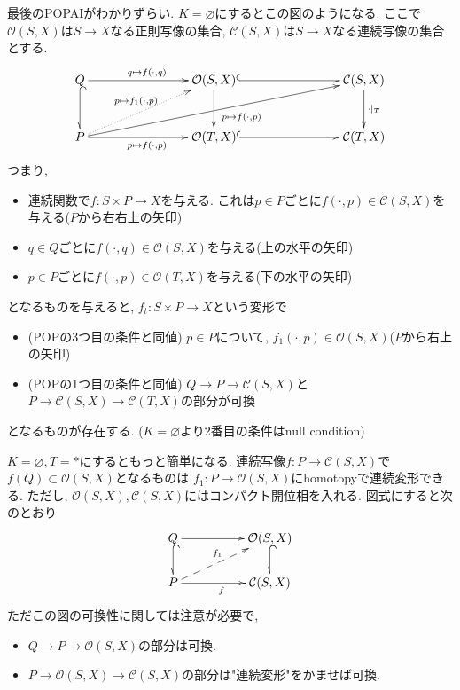 \documentclass[dvipdfmx,a4paper,11pt]{article} %
\theoremstyle{definition}
\theoremstyle{remark}
\numberwithin{equation}{section}
\begin{document}
最後のPOPAIがわかりずらい. $K=\varnothing$にするとこの図のようになる.
ここで$\mathcal{O}(S,X) $は$S \to X$なる正則写像の集合, $\mathcal{C}(S,X) $は$S \to X$なる連続写像の集合とする.
\[
\xymatrix@C=80pt@R=30pt{
Q \ar[r]^{q \mapsto f(\cdot,q)} \ar@{^{(}-_>}[d]& \mathcal{O}(S,X) \ar@{^{(}-_>}[r] \ar[d]& \mathcal{C}(S,X) \ar[d]^{\cdot |_{T}} \\
P \ar[r]_{p \mapsto f(\cdot,p)} \ar@{.>}[ur]^{p \mapsto f_1(\cdot, p)}  \ar@{->}[urr]_{ \quad \quad p \mapsto f(\cdot, p)} & \mathcal{O}(T,X) \ar@{^{(}-_>}[r] & \mathcal{C}(T,X)
}
\]
つまり, 
\begin{itemize}
\item 連続関数で\(f : S \times P \to X\)を与える. これは$p \in P$ごとに$f(\cdot,p)  \in \mathcal{C}(S,X)$を与える($P$から右右上の矢印)
\item $q \in Q$ごとに$f(\cdot,q)  \in \mathcal{O}(S,X)$を与える(上の水平の矢印)
\item$p \in P$ごとに$f(\cdot,p)  \in \mathcal{O}(T,X)$を与える(下の水平の矢印)
\end{itemize}
となるものを与えると, \(f_t : S \times P \to X\)という変形で
\begin{itemize}
\item (POPの3つ目の条件と同値) $p \in P$について, $f_1(\cdot,p)  \in \mathcal{O}(S,X)$($P$から右上の矢印)
\item (POPの1つ目の条件と同値) $Q \to P \to \mathcal{C}(S,X)$と$P \to \mathcal{C}(S,X) \to  \mathcal{C}(T,X)$の部分が可換
\end{itemize}
となるものが存在する. ($K=\varnothing$より2番目の条件はnull condition)

$K=\varnothing, T=\ast$にするともっと簡単になる. 
連続写像$f : P \to \mathcal{C}(S,X) $で$f(Q) \subset \mathcal{O}(S,X) $となるものは
$f _1: P \to \mathcal{O}(S,X)$にhomotopyで連続変形できる.
ただし, $\mathcal{O}(S,X), \mathcal{C}(S,X)$にはコンパクト開位相を入れる. 
図式にすると次のとおり
 \[
\xymatrix@C=50pt@R=20pt{
Q\ar@{->}[r]\ar@{^{(}-_>}[d] &\mathcal{O}(S,X) \ar@{^{(}-_>}[d]  \\
P\ar@{->}[r]_{f}\ar@{-->}[ru]^{f_1}  & \mathcal{C}(S,X)
}
\]
ただこの図の可換性に関しては注意が必要で, 
\begin{itemize}
\item $Q \to P \to \mathcal{O}(S,X) $の部分は可換.
\item $ P \to \mathcal{O}(S,X) \to \mathcal{C}(S,X) $の部分は"連続変形"をかませば可換.
\end{itemize}
\end{document}
